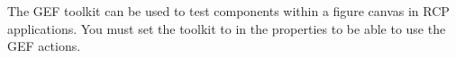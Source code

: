 \label{GEFToolkit}
The GEF toolkit can be used to test components within a figure canvas in RCP applications. You must set the toolkit to  in the \gdproject{} properties to be able to use the GEF actions. 
